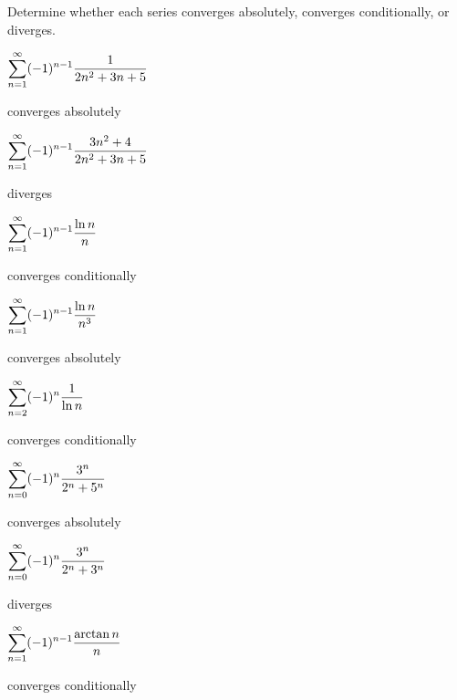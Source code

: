 \begin{exercises}

Determine whether each series converges absolutely, converges
conditionally, or diverges.

\twocol

\begin{exercise} $\displaystyle\sum_{n=1}^\infty (-1)^{n-1}{1\over 2n^2+3n+5}$
\begin{answer} converges absolutely
\end{answer}\end{exercise}

\begin{exercise} $\displaystyle\sum_{n=1}^\infty (-1)^{n-1}{3n^2+4\over 2n^2+3n+5}$
\begin{answer} diverges
\end{answer}\end{exercise}

\begin{exercise} $\displaystyle\sum_{n=1}^\infty (-1)^{n-1}{\ln n\over n}$
\begin{answer} converges conditionally
\end{answer}\end{exercise}

\begin{exercise} $\displaystyle\sum_{n=1}^\infty (-1)^{n-1} {\ln n\over n^3}$
\begin{answer} converges absolutely
\end{answer}\end{exercise}

\begin{exercise} $\displaystyle\sum_{n=2}^\infty (-1)^n{1\over \ln n}$
\begin{answer} converges conditionally
\end{answer}\end{exercise}

\begin{exercise} $\displaystyle\sum_{n=0}^\infty (-1)^{n} {3^n\over 2^n+5^n}$
\begin{answer} converges absolutely
\end{answer}\end{exercise}

\begin{exercise} $\displaystyle\sum_{n=0}^\infty (-1)^{n} {3^n\over 2^n+3^n}$
\begin{answer} diverges
\end{answer}\end{exercise}

\begin{exercise} $\displaystyle\sum_{n=1}^\infty (-1)^{n-1} {\arctan n\over n}$
\begin{answer} converges conditionally
\end{answer}\end{exercise}

\endtwocol

\end{exercises}


